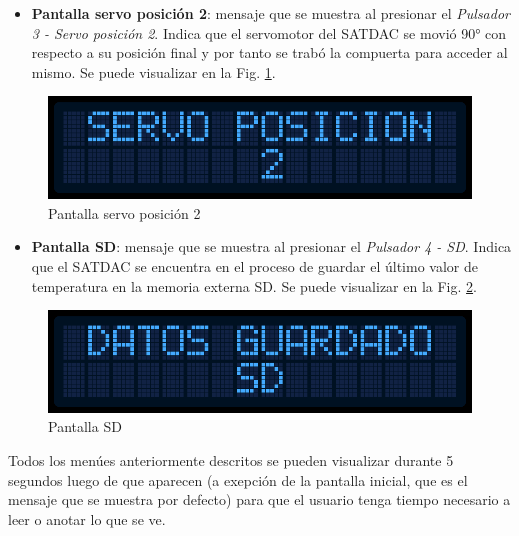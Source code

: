 \documentclass[conference]{IEEEtran}
\begin{document}
\begin{itemize}
\item \textbf{Pantalla servo posición 2}: mensaje que se muestra al presionar el \emph{Pulsador 3 - Servo posición 2}. Indica que el servomotor del SATDAC se movió 90° con respecto a su posición final y por tanto se trabó la compuerta para acceder al mismo. Se puede visualizar en la Fig. \ref{fig:pantallaServo2}.
\end{itemize}

\begin{figure}[htbp]
\centering
\includegraphics[width=.9\linewidth]{../../images/pantallaServo2.png}
\caption{\label{fig:pantallaServo2}Pantalla servo posición 2}
\end{figure}

\begin{itemize}
\item \textbf{Pantalla SD}: mensaje que se muestra al presionar el \emph{Pulsador 4 - SD}. Indica que el SATDAC se encuentra en el proceso de guardar el último valor de temperatura en la memoria externa SD. Se puede visualizar en la Fig. \ref{fig:pantallaSD}.
\end{itemize}

\begin{figure}[htbp]
\centering
\includegraphics[width=.9\linewidth]{../../images/pantallaSD.png}
\caption{\label{fig:pantallaSD}Pantalla SD}
\end{figure}

Todos los menúes anteriormente descritos se pueden visualizar durante 5 segundos luego de que aparecen (a exepción de la pantalla inicial, que es el mensaje que se muestra por defecto) para que el usuario tenga tiempo necesario a leer o anotar lo que se ve.
\end{document}
